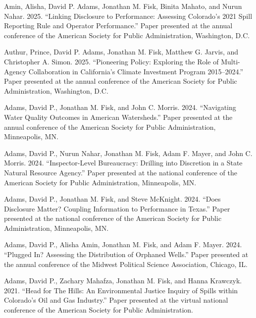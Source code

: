 \documentclass[12pt,letterpaper]{article}
\renewenvironment{itemize}{
  \begin{list}{}{
    \setlength{\leftmargin}{1.5em}
    \setlength{\itemsep}{0.25em}
    \setlength{\parskip}{0pt}
    \setlength{\parsep}{0.25em}
  }
}{
  \end{list}
}
\begin{document}
	\begin{itemize}\leftmargin=2pt\itemindent=-15pt\leftmargin=2pt\itemindent=-15pt

    \item Amin, Alisha, David P. Adams, Jonathan M. Fisk, Binita Mahato, and Nurun Nahar. 2025. ``Linking Disclosure to Performance: Assessing Colorado's 2021 Spill Reporting Rule and Operator Performance.'' Paper presented at the annual conference of the American Society for Public Administration, Washington, D.C.

    \item Authur, Prince, David P. Adams, Jonathan M. Fisk, Matthew G. Jarvis, and Christopher A. Simon. 2025. ``Pioneering Policy: Exploring the Role of Multi-Agency Collaboration in California's Climate Investment Program 2015--2024.'' Paper presented at the annual conference of the American Society for Public Administration, Washington, D.C.
    
    \item Adams, David P., Jonathan M. Fisk, and John C. Morris. 2024. ``Navigating Water Quality Outcomes in American Watersheds.'' Paper presented at the annual conference of the American Society for Public Administration, Minneapolis, MN.
    
    \item Adams, David P., Nurun Nahar, Jonathan M. Fisk, Adam F. Mayer, and John C. Morris. 2024. ``Inspector-Level Bureaucracy: Drilling into Discretion in a State Natural Resource Agency.'' Paper presented at the national conference of the American Society for Public Administration, Minneapolis, MN.
    
    \item Adams, David P., Jonathan M. Fisk, and Steve McKnight. 2024. ``Does Disclosure Matter? Coupling Information to Performance in Texas.'' Paper presented at the national conference of the American Society for Public Administration, Minneapolis, MN.
    
    \item Adams, David P., Alisha Amin, Jonathan M. Fisk, and Adam F. Mayer. 2024. ``Plugged In? Assessing the Distribution of Orphaned Wells.'' Paper presented at the annual conference of the Midwest Political Science Association, Chicago, IL.

    \item Adams, David P., Zachary Mahafza, Jonathan M. Fisk, and Hanna Krawczyk. 2021. ``Head for The Hills: An Environmental Justice Inquiry of Spills within Colorado's Oil and Gas Industry.'' Paper presented at the virtual national conference of the American Society for Public Administration.


\end{itemize}
\end{document}
